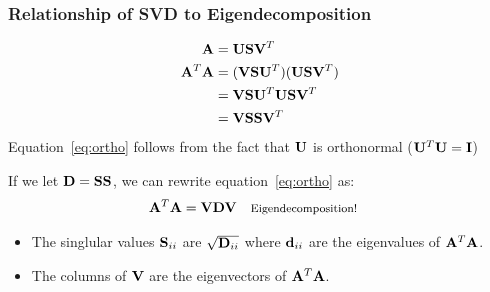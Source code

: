 \documentclass{beamer}
\begin{document}
\begin{frame}[fragile]
  \frametitle{Relationship of SVD to Eigendecomposition}

\begin{align}
  \mathbf{A} &= \mathbf{U} \mathbf{S} \mathbf{V}^T \\
  \mathbf{A}^ T\mathbf{A} &= (\mathbf{V}\mathbf{S}\mathbf{U}^T)(\mathbf{U} \mathbf{S} \mathbf{V}^T)\\
      &= \mathbf{V} \mathbf{S} \mathbf{U}^T \mathbf{U} \mathbf{S} \mathbf{V}^T \\
      &= \mathbf{V}\mathbf{S}\mathbf{S}\mathbf{V}^T  \label{eq:ortho}
\end{align}
Equation~\ref{eq:ortho} follows from the fact that $\mathbf{U}$ is orthonormal ($\mathbf{U}^T \mathbf{U} = \mathbf{I}$)

\smallskip
If we let $\mathbf{D} = \mathbf{S}\mathbf{S}$, we can rewrite equation~\ref{eq:ortho} as:
\begin{align}
  \mathbf{A}^ T\mathbf{A} &= \mathbf{V}\mathbf{D}\mathbf{V} && \text{\footnotesize Eigendecomposition!}
\end{align}

\begin{itemize}
\item The singlular values $\mathbf{S}_{ii}$ are $\sqrt{\mathbf{D}_{ii}}$ where $\mathbf{d}_{ii}$ are the eigenvalues of $\mathbf{A}^ T\mathbf{A}$.

\item The columns of $\mathbf{V}$ are the eigenvectors of $\mathbf{A}^ T\mathbf{A}$.
\end{itemize}

\end{frame}



\end{document}
